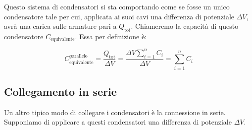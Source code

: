 Questo sistema di condensatori si sta comportando come se fosse un unico condensatore tale per cui, applicata ai suoi cavi una differenza di potenziale $ \Delta V $, avrà una carica sulle armature pari a $Q_{\text{tot}}$. Chiameremo la capacità di questo condensatore $C_{\text{equivalente}}$. Essa per definizione è:

\[
	\boxed{C_{\text{equivalente}}^{\text{parallelo}} = \frac{Q_{\text{tot}}}{\Delta V} = \frac{\Delta V \sum_{i=1}^n C_i}{\Delta V} = \sum_{i=1}^n C_i}
\]

\subsection{Collegamento in serie}

Un altro tipico modo di collegare i condensatori è la connessione in serie.
Supponiamo di applicare a questi condensatori una differenza di potenziale $\Delta V$.

